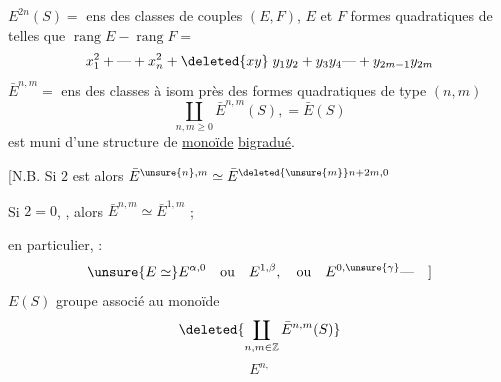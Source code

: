 $E^{2n}(S)=$ ens des classes de couples $(E,F)$, $E$ et $F$ formes quadratiques  de    telles que $\operatorname{rang}E-\operatorname{rang}F=$
\[
x_1^2+\text{---}+x_n^2+\deleted{xy}\;y_1y_2+y_3y_4\text{---}+y_{2m-1}y_{2m}
\]
$\bar E^{n,m}=$ ens des classes à isom près des formes quadratiques  de type $(n,m)$
\[
\coprod_{n,m\geq0}\bar E^{n,m}(S),=\bar E(S)
\]
est muni d’une structure de \uline{monoïde} \uline{bigradué}.

 [N.B. Si $2$ est  alors $\bar E^{\unsure{n},m}\simeq\bar E^{\deleted{\unsure{m}}n+2m,0}$

Si $2=0$, , alors $\bar E^{n,m}\simeq\bar E^{1,m}$ ;


en particulier,  : 
\[
\unsure{E\simeq}E^{\alpha,0}\quad\text{ou}\quad E^{1,\beta},\quad\text{ou}\quad E^{0,\unsure{\gamma}}\text{---}\quad]
\]
$E(S)$ groupe associé au monoïde
\[
\deleted{\coprod_{n,m\in\mathbb Z}\bar E^{n,m}(S)}
\]
\[
E^{n,}
\]
